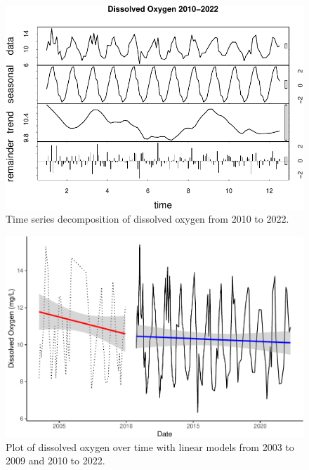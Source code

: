 \documentclass[
  12pt,
]{article}
\begin{document}
\begin{figure}

{\centering \includegraphics{Project_Template_files/figure-latex/Plot of Late Dissolved Oxygen Time Series Decomposition-1} 

}

\caption{Time series decomposition of dissolved oxygen from 2010 to 2022.}\label{fig:Plot of Late Dissolved Oxygen Time Series Decomposition}
\end{figure}

\newpage

\begin{figure}

{\centering \includegraphics{Project_Template_files/figure-latex/Plot of Dissolved Oxygen over time with LMs-1} 

}

\caption{Plot of dissolved oxygen over time with linear models from 2003 to 2009 and 2010 to 2022.}\label{fig:Plot of Dissolved Oxygen over time with LMs}
\end{figure}
\end{document}
